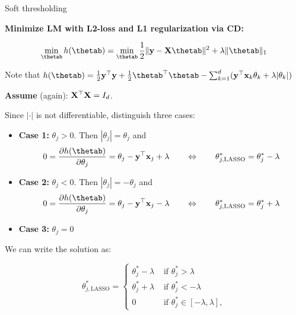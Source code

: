 \documentclass[11pt,compress,t,notes=noshow, xcolor=table]{beamer}
\begin{document}
\begin{vbframe}{Soft thresholding}

\textbf{Minimize LM with L2-loss and L1 regularization via CD:}

\begin{equation*}
    \min_{\thetab} h(\thetab) = \min_{\thetab} \frac{1}{2}\|\yv - \Xmat \thetab\|^2 + \lambda \|\thetab\|_1 %
\end{equation*}

Note that $h(\thetab) = \frac{1}{2}\yv^\top \yv + \frac{1}{2}\thetab^\top \thetab  - \sum_{k = 1}^d (\yv^\top \xv_k \theta_k + \lambda|\theta_k|)$

\medskip

\textbf{Assume} (again): $\mathbf{X}^\top \mathbf{X} = I_d$.

Since $|\cdot|$ is not differentiable, distinguish three cases:

\medskip

\begin{footnotesize}
    \begin{itemize}
        \item \textbf{Case 1:} $\theta_j > 0$.
            Then $|\theta_j| = \theta_j$ and 
            \begin{equation*}
                0 = \frac{\partial{h}(\thetab)}{\partial \theta_j} = \theta_j - \yv^\top \xv_j + \lambda \qquad \Leftrightarrow \qquad \theta^\ast_{j, \text{LASSO}} = \theta^\ast_j - \lambda        
            \end{equation*}
        \item \textbf{Case 2:} $\theta_j < 0$.
            Then $|\theta_j| = - \theta_j$ and 
            \begin{equation*}
                0 = \frac{\partial{h}(\thetab)}{\partial \theta_j} = \theta_j - \yv^\top \xv_j - \lambda \qquad \Leftrightarrow \qquad \theta^\ast_{j, \text{LASSO}} = \theta^\ast_j + \lambda
                \end{equation*}
        \item \textbf{Case 3:} $\theta_j = 0$
    \end{itemize}
\end{footnotesize}

We can write the solution as: 

\begin{equation*}
    \theta^\ast_{j, \text{LASSO}} =
    \begin{cases}
        \theta^\ast_j - \lambda & \text{ if } \theta^\ast_j > \lambda \\
        \theta^\ast_j + \lambda & \text{ if } \theta^\ast_j < - \lambda \\
        0 &  \text{ if }  \theta^\ast_j \in [- \lambda, \lambda],
    \end{cases}
\end{equation*}


\end{vbframe}
\end{document}
